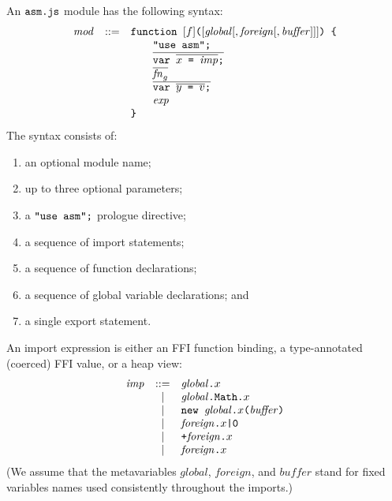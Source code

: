 \documentclass{article}
\newcommand{\funcall}[2]{{#1}\mathjs{(}{#2}\mathjs{)}}
\newcommand{\seq}[1]{\overline{{#1}}}
\newcommand{\mathjs}[1]{\mbox{\texttt{{#1}}}}
\newcommand{\fun}[3]{\mathjs{function }{#1}\mathjs{(}{#2}\mathjs{) \char123{} }{#3}\mathjs{ \char125{}}}
\newcommand{\var}[1]{\mathjs{var }{#1}\mathjs{;}}
\begin{document}
An $\mathjs{asm.js}$ module has the following syntax:
\[
\begin{array}{rcl}
\mathit{mod} & ::= & \mathjs{function }[f]\mathjs{(}[\mathit{global}[, \mathit{foreign}[, \mathit{buffer}]]]\mathjs{) \char123{}} \\
             &     & \qquad\mathjs{"use asm";} \\
             &     & \qquad\seq{\var{\seq{x \mathjs{ = } \mathit{imp}}}} \\
             &     & \qquad\seq{\mathit{fn}_g} \\
             &     & \qquad\seq{\var{\seq{y \mathjs{ = } v}}} \\
             &     & \qquad\mathit{exp} \\
             &     & \mathjs{\char125{}} \\
\end{array}
\]
The syntax consists of:
\begin{enumerate}
\item an optional module name;
\item up to three optional parameters;
\item a $\mathjs{"use asm";}$ prologue directive;
\item a sequence of import statements;
\item a sequence of function declarations;
\item a sequence of global variable declarations; and
\item a single export statement.
\end{enumerate}

An import expression is either an FFI function binding, a
type-annotated (coerced) FFI value, or a heap view:
\[
\begin{array}{rcl}
\mathit{imp}  & ::= & \mathit{global}\mathjs{.}x \\
              &  |  & \mathit{global}\mathjs{.Math.}x \\
              &  |  & \mathjs{new }\funcall{\mathit{global}\mathjs{.}x}{\mathit{buffer}} \\
              &  |  & \mathit{foreign}\mathjs{.}x\mathjs{|0} \\
              &  |  & \mathjs{+}\mathit{foreign}\mathjs{.}x \\
              &  |  & \mathit{foreign}\mathjs{.}x \\
\end{array}
\]
(We assume that the metavariables $\mathit{global}$,
$\mathit{foreign}$, and $\mathit{buffer}$ stand for fixed variables
names used consistently throughout the imports.)
\end{document}
